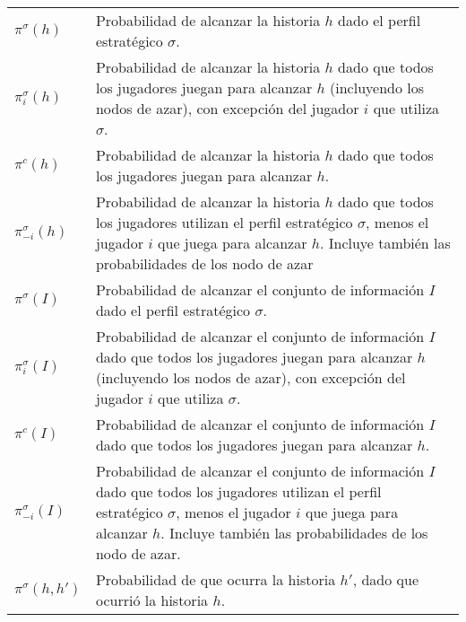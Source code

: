 \begingroup
\renewcommand{\arraystretch}{1.5}
\begin{tabular}{l p{12cm}}
$\pi^{\sigma}(h)$ & Probabilidad de alcanzar la historia $h$ dado el perfil estratégico $\sigma$. \\
$\pi^{\sigma}_i(h)$ & Probabilidad de alcanzar la historia $h$ dado que todos los jugadores juegan para alcanzar $h$ (incluyendo los nodos de azar), con excepción del jugador $i$ que utiliza $\sigma$. \\
$\pi^c(h)$ & Probabilidad de alcanzar la historia $h$ dado que todos los jugadores juegan para alcanzar $h$. \\
$\pi^{\sigma}_{-i}(h)$ & Probabilidad de alcanzar la historia $h$ dado que todos los jugadores utilizan el perfil estratégico $\sigma$, menos el jugador $i$ que juega para alcanzar $h$. Incluye también las probabilidades de los nodo de azar \\
$\pi^{\sigma}(I)$ & Probabilidad de alcanzar el conjunto de información $I$ dado el perfil estratégico $\sigma$. \\
$\pi^{\sigma}_i(I)$ & Probabilidad de alcanzar el conjunto de información $I$ dado que todos los jugadores juegan para alcanzar $h$ (incluyendo los nodos de azar), con excepción del jugador $i$ que utiliza $\sigma$. \\
$\pi^c(I)$ & Probabilidad de alcanzar el conjunto de información $I$ dado que todos los jugadores juegan para alcanzar $h$. \\
$\pi^{\sigma}_{-i}(I)$ & Probabilidad de alcanzar el conjunto de información $I$ dado que todos los jugadores utilizan el perfil estratégico $\sigma$, menos el jugador $i$ que juega para alcanzar $h$. Incluye también las probabilidades de los nodo de azar. \\
$\pi^{\sigma}(h, h')$ & Probabilidad de que ocurra la historia $h'$, dado que ocurrió la historia $h$. \\
\end{tabular}
\endgroup
